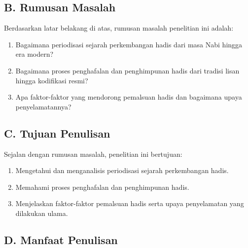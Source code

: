 \subsection*{B. Rumusan Masalah}

Berdasarkan latar belakang di atas, rumusan masalah penelitian ini adalah:

\begin{enumerate}[leftmargin=1.27cm,itemsep=2pt,parsep=2pt]
\item Bagaimana periodisasi sejarah perkembangan hadis dari masa Nabi hingga era modern?

\item Bagaimana proses penghafalan dan penghimpunan hadis dari tradisi lisan hingga kodifikasi resmi?

\item Apa faktor-faktor yang mendorong pemalsuan hadis dan bagaimana upaya penyelamatannya?

\end{enumerate}
\subsection*{C. Tujuan Penulisan}

Sejalan dengan rumusan masalah, penelitian ini bertujuan:

\begin{enumerate}[leftmargin=1.27cm,itemsep=2pt,parsep=2pt]
\item Mengetahui dan menganalisis periodisasi sejarah perkembangan hadis.

\item Memahami proses penghafalan dan penghimpunan hadis.

\item Menjelaskan faktor-faktor pemalsuan hadis serta upaya penyelamatan yang dilakukan ulama.

\end{enumerate}
\subsection*{D. Manfaat Penulisan}

